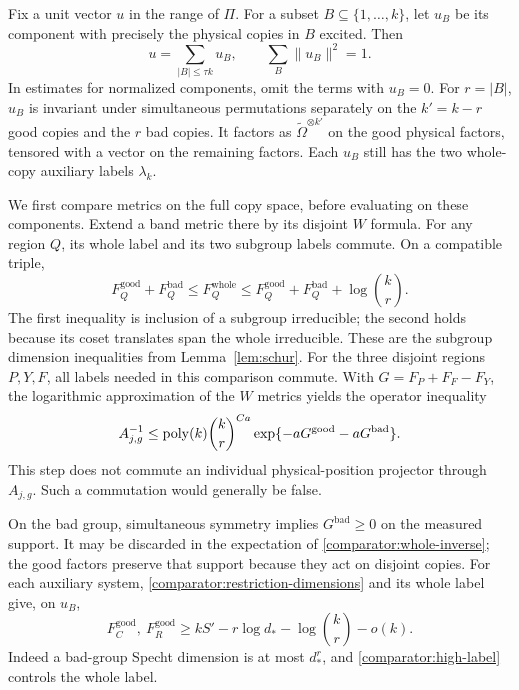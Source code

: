 Fix a unit vector $u$ in the range of $\Pi$.  For a subset
$B\subseteq\{1,\ldots,k\}$, let $u_B$ be its component with precisely
the physical copies in $B$ excited.  Then
\[
 u=\sum_{|B|\le\tau k}u_B,\qquad
 \sum_B\|u_B\|^2=1.
\]
In estimates for normalized components, omit the terms with $u_B=0$.
For $r=|B|$, $u_B$ is invariant under simultaneous permutations separately
on the $k'=k-r$ good copies and the $r$ bad copies.  It factors as
$\widetilde\Omega^{\otimes k'}$ on the good physical factors, tensored
with a vector on the remaining factors.  Each $u_B$ still has the two
whole-copy auxiliary labels $\lambda_k$.

We first compare metrics on the full copy space, before evaluating on
these components.  Extend a band metric there by its disjoint $W$ formula.
For any region $Q$, its whole label and its two subgroup labels commute.
On a compatible triple,
\begin{equation}
 F_Q^{\mathrm{good}}+F_Q^{\mathrm{bad}}
 \le F_Q^{\mathrm{whole}}
 \le F_Q^{\mathrm{good}}+F_Q^{\mathrm{bad}}+\log\binom{k}{r}.
 \label{comparator:restriction-dimensions}
\end{equation}
The first inequality is inclusion of a subgroup irreducible; the second
holds because its coset translates span the whole irreducible.  These are
the subgroup dimension inequalities from Lemma~\ref{lem:schur}.
For the three disjoint regions $P,Y,F$, all labels needed in this
comparison commute.  With
$G=F_P+F_F-F_Y$, the logarithmic approximation of the $W$ metrics yields
the operator inequality
\begin{equation}
 A_{j,g}^{-1}\le
 \operatorname{poly}(k)\binom{k}{r}^{Ca}
             \exp\{-aG^{\mathrm{good}}-aG^{\mathrm{bad}}\}.
 \label{comparator:whole-inverse}
\end{equation}
This step does not commute an individual physical-position projector
through $A_{j,g}$.  Such a commutation would generally be false.

On the bad group, simultaneous symmetry implies
$G^{\mathrm{bad}}\ge0$ on the measured support.  It may be discarded in
the expectation of \eqref{comparator:whole-inverse}; the good factors
preserve that support because they act on disjoint copies.  For each
auxiliary system, \eqref{comparator:restriction-dimensions} and its whole
label give, on $u_B$,
\begin{equation}
 F_C^{\mathrm{good}},\ F_R^{\mathrm{good}}
       \ge kS'-r\log d_*-\log\binom{k}{r}-o(k).
 \label{comparator:good-auxiliary}
\end{equation}
Indeed a bad-group Specht dimension is at most $d_*^r$, and
\eqref{comparator:high-label} controls the whole label.

